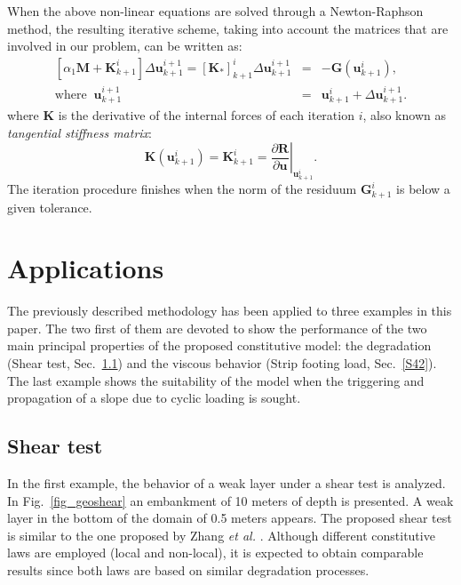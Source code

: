 \documentclass[applsci,journal,article,submit,moreauthors,pdftex]{Definitions/mdpi}
\begin{document}
When the above non-linear equations are solved through a Newton-Raphson method, the resulting iterative scheme, taking into account the matrices that are involved in our problem, can be written as:
\begin{eqnarray}\label{eq_uw32}
\left[\alpha_1\boldsymbol {M}+\boldsymbol {K}^{i}_{k+1}\right]\Delta\boldsymbol{u}^{i+1}_{k+1} = \left[\boldsymbol {K_{*}}\right]^{i}_{k+1} \Delta\boldsymbol{u}^{i+1}_{k+1} &=& -\boldsymbol {G}(\boldsymbol {u}^{i}_{k+1}), \\
\mbox{where}\;\; \boldsymbol {u}^{i+1}_{k+1} &=& \boldsymbol {u}^{i}_{k+1} + \Delta \boldsymbol {u}^{i+1}_{k+1}.  \nonumber 
\end{eqnarray}
where $\boldsymbol {K}$ is the derivative of the internal forces of each iteration $i$, also known as \textit{tangential stiffness matrix}:
\begin{equation}\label{eq_uw31}
\boldsymbol {K}(\boldsymbol {u}^{i}_{k+1})=\boldsymbol {K}^{i}_{k+1}=\left.\frac{\partial\boldsymbol {R}}{\partial \boldsymbol {u}}\right|_{\boldsymbol{u}^{i}_{k+1}}.
\end{equation}
The iteration procedure finishes when the norm of the residuum $\boldsymbol {G}^{i}_{k+1}$ is below a given tolerance.

\section{Applications}
\label{S4}
The previously described methodology has been applied to three examples in this paper. The two first of them are devoted to show the performance of the two main principal properties of the proposed constitutive model: the degradation (Shear test, Sec.~\ref{S41}) and the viscous behavior (Strip footing load, Sec.~\ref{S42}). The last example shows the suitability of the model when the triggering and propagation of a slope due to cyclic loading is sought.

\subsection{Shear test}
\label{S41}
In the first example, the behavior of a weak layer under a shear test is analyzed. In Fig.~\ref{fig_geoshear} an embankment of 10 meters of depth is presented. A weak layer in the bottom of the domain of 0.5 meters appears. The proposed shear test is similar to the one proposed by Zhang \textit{et al.} \cite{Zhang2015}. Although different constitutive laws are employed (local and non-local), it is expected to obtain comparable results since both laws are based on similar degradation processes.
\end{document}
